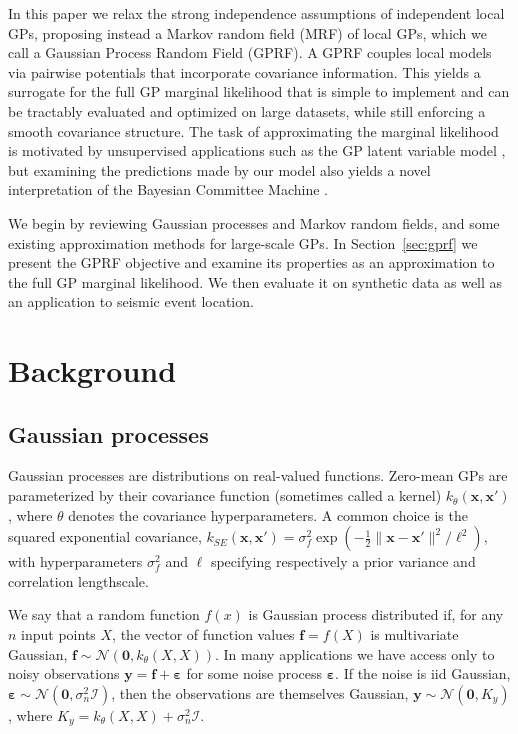 \documentclass{article}
\newcommand{\N}{\mathcal{N}}
\newcommand{\I}{\mathcal{I}}
\newcommand{\eps}{\varepsilon}
\renewcommand{\v}[1]{\mathbf{#1}}
\begin{document}
In this paper we relax the strong independence assumptions of
independent local GPs, proposing instead a Markov random field (MRF) of
local GPs, which we call a Gaussian Process Random Field (GPRF). A
GPRF couples local models via pairwise potentials that incorporate
covariance information. This yields a surrogate for the full GP
marginal likelihood that is simple to implement and 
can be tractably evaluated and optimized on
large datasets, while still enforcing a smooth covariance
structure. The task of approximating the marginal likelihood is
motivated by unsupervised applications such as the GP latent variable
model \cite{lawrence2004gaussian}, but examining the predictions made by our model also
yields a novel interpretation of the Bayesian Committee Machine \cite{tresp2000bayesian}.

We begin by reviewing Gaussian processes and Markov random fields, and
some existing approximation methods for large-scale GPs. In
Section~\ref{sec:gprf} we present the GPRF objective and examine its
properties as an approximation to the full GP marginal likelihood.  We
then evaluate it on synthetic data as well as an application to seismic event location. 
\vspace{-0.2cm}
\section{Background}
\vspace{-0.2cm}
\subsection{Gaussian processes}
\vspace{-0.2cm}
Gaussian processes \citep{rasmussen2006} are
distributions on real-valued functions. Zero-mean GPs are
parameterized by their covariance function (sometimes called a kernel)
$k_\theta(\v{x}, \v{x}')$,  where $\theta$ denotes the covariance hyperparameters. A common choice is the squared
exponential covariance, $k_{SE}(\v{x}, \v{x}') =
\sigma^2_f\exp\left(-\frac{1}{2}\|\v{x}-\v{x}'\|^2 / \ell^2\right)$, with
hyperparameters $\sigma^2_f$  and $\ell$ specifying respectively a
prior variance and correlation lengthscale. 

We say that a random function $f(x)$ is Gaussian process distributed if, for
any $n$ input points $X$, the vector of function values $\v{f} = f(X)$ is
multivariate Gaussian, $\v{f} \sim \N(\v{0}, k_\theta(X, X)).$ In many applications we
have access only to noisy observations $\v{y} = \v{f} + \v{\eps}$ for some
noise process $\v{\eps}$. If the noise is iid Gaussian, $\v{\eps}\sim
\N(\v{0}, \sigma_n^2 \I)$, then the observations are themselves Gaussian, $\v{y} \sim \N(\v{0}, K_y)$, where $K_y = k_\theta(X, X) + \sigma^2_n\I.$
\end{document}
